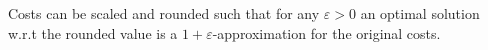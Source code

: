 \begin{frame}
\begin{theorem}
Costs can be scaled and rounded such that for any $\varepsilon > 0$ an optimal solution 
w.r.t the rounded value is a $1 + \varepsilon$-approximation for the original costs.
\end{theorem}
\end{frame}